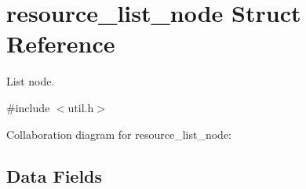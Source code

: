 \hypertarget{structresource__list__node}{}\section{resource\+\_\+list\+\_\+node Struct Reference}
\label{structresource__list__node}


List node.  




{\ttfamily \#include $<$util.\+h$>$}



Collaboration diagram for resource\+\_\+list\+\_\+node\+:
\subsection*{Data Fields}

